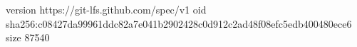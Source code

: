 version https://git-lfs.github.com/spec/v1
oid sha256:c08427da99961ddc82a7e041b2902428c0d912c2ad48f08efc5edb400480ece6
size 87540
